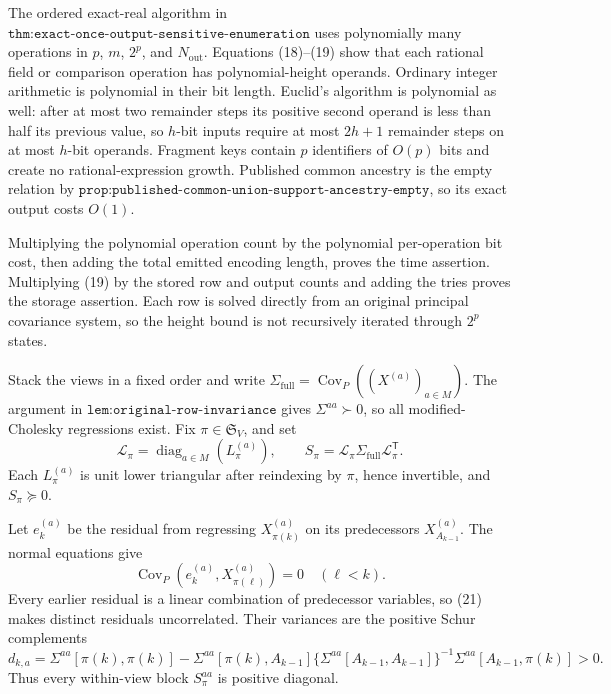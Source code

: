 The ordered exact-real algorithm in \(\texttt{thm:exact-once-output-sensitive-enumeration}\) uses polynomially many operations in \(p\), \(m\), \(2^p\), and \(N_{\mathrm{out}}\).  Equations (18)--(19) show that each rational field or comparison operation has polynomial-height operands.  Ordinary integer arithmetic is polynomial in their bit length.  Euclid's algorithm is polynomial as well: after at most two remainder steps its positive second operand is less than half its previous value, so \(h\)-bit inputs require at most \(2h+1\) remainder steps on at most \(h\)-bit operands.  Fragment keys contain \(p\) identifiers of \(O(p)\) bits and create no rational-expression growth.  Published common ancestry is the empty relation by \(\texttt{prop:published-common-union-support-ancestry-empty}\), so its exact output costs \(O(1)\).

Multiplying the polynomial operation count by the polynomial per-operation bit cost, then adding the total emitted encoding length, proves the time assertion.  Multiplying (19) by the stored row and output counts and adding the tries proves the storage assertion.  Each row is solved directly from an original principal covariance system, so the height bound is not recursively iterated through \(2^p\) states.

Stack the views in a fixed order and write \(\Sigma_{\mathrm{full}}=\operatorname{Cov}_P((X^{(a)})_{a\in M})\).  The argument in \(\texttt{lem:original-row-invariance}\) gives \(\Sigma^{aa}\succ0\), so all modified-Cholesky regressions exist.  Fix \(\pi\in\mathfrak S_V\), and set
\[
 \mathcal L_\pi=\operatorname{diag}_{a\in M}(L_\pi^{(a)}),
 \qquad S_\pi=\mathcal L_\pi\Sigma_{\mathrm{full}}
 \mathcal L_\pi^{\mathsf T}.
 \tag{20}
\]
Each \(L_\pi^{(a)}\) is unit lower triangular after reindexing by \(\pi\), hence invertible, and \(S_\pi\succeq0\).

Let \(e_k^{(a)}\) be the residual from regressing \(X_{\pi(k)}^{(a)}\) on its predecessors \(X_{A_{k-1}}^{(a)}\).  The normal equations give
\[
 \operatorname{Cov}_P(e_k^{(a)},X_{\pi(\ell)}^{(a)})=0
 \quad(\ell<k).
 \tag{21}
\]
Every earlier residual is a linear combination of predecessor variables, so (21) makes distinct residuals uncorrelated.  Their variances are the positive Schur complements
\[
 d_{k,a}=\Sigma^{aa}[\pi(k),\pi(k)]-
 \Sigma^{aa}[\pi(k),A_{k-1}]
 \{\Sigma^{aa}[A_{k-1},A_{k-1}]\}^{-1}
 \Sigma^{aa}[A_{k-1},\pi(k)]>0.
 \tag{22}
\]
Thus every within-view block \(S_\pi^{aa}\) is positive diagonal.


